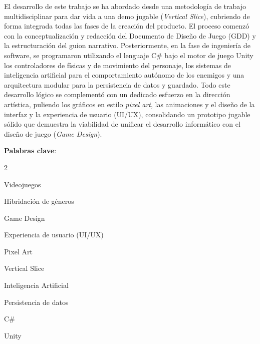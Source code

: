 \documentclass[12pt,twoside,titlepage]{report}
\begin{document}
El desarrollo de este trabajo se ha abordado desde una metodología de trabajo multidisciplinar para dar vida a una demo jugable (\textit{Vertical Slice}), cubriendo de forma integrada todas las fases de la creación del producto. El proceso comenzó con la conceptualización y redacción del Documento de Diseño de Juego (GDD) y la estructuración del guion narrativo. Posteriormente, en la fase de ingeniería de software, se programaron utilizando el lenguaje C\# bajo el motor de juego Unity los controladores de físicas y de movimiento del personaje, los sistemas de inteligencia artificial para el comportamiento autónomo de los enemigos y una arquitectura modular para la persistencia de datos y guardado. Todo este desarrollo lógico se complementó con un dedicado esfuerzo en la dirección artística, puliendo los gráficos en estilo \textit{pixel art}, las animaciones y el diseño de la interfaz y la experiencia de usuario (UI/UX), consolidando un prototipo jugable sólido que demuestra la viabilidad de unificar el desarrollo informático con el diseño de juego (\textit{Game Design}).

\vspace{1.5em}
\noindent \textbf{Palabras clave}:
\begin{multicols}{2}
\begin{compactitem}
    \item Videojuegos
    \item Hibridación de géneros
    \item Game Design
    \item Experiencia de usuario (UI/UX)
    \item Pixel Art
    \item Vertical Slice
    \item Inteligencia Artificial
    \item Persistencia de datos
    \item C\#
    \item Unity
\end{compactitem}
\end{multicols}

\afterpage{\blankpage}







\setlength{\parskip}{1pt}
\renewcommand{\baselinestretch}{1}
\renewcommand{\contentsname}{Índice de contenidos}
\end{document}
